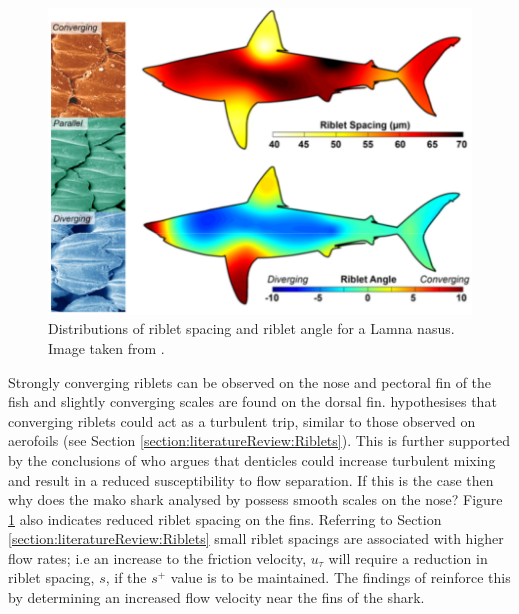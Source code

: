 \documentclass[12pt,oneside,a4paper]{article}
\begin{document}
\begin{figure}[!b]
\centering
\includegraphics[width=0.8\linewidth]{images/litReview/fletcherSharkMorphology.png}
\caption{Distributions of riblet spacing and riblet angle for a Lamna nasus. Image taken from \cite{fletcher2014phd}.}
\label{figure:litReview:fletcherMorphology}
\end{figure}
%
Strongly converging riblets can be observed on the nose and pectoral fin of the fish and slightly converging scales are found on the dorsal fin. \cite{fletcher2014phd} hypothesises that converging riblets could act as a turbulent trip, similar to those observed on aerofoils (see Section \ref{section:literatureReview:Riblets}). This is further supported by the conclusions of \cite{bechert1985} who argues that denticles could increase turbulent mixing and result in a reduced susceptibility to flow separation. If this is the case then why does the mako shark analysed by \cite{diez2015} possess smooth scales on the nose? Figure \ref{figure:litReview:fletcherMorphology} also indicates reduced riblet spacing on the fins. Referring to Section \ref{section:literatureReview:Riblets} small riblet spacings are associated with higher flow rates; i.e an increase to the friction velocity, $u_\tau$ will require a reduction in riblet spacing, $s$, if the $s^+$ value is to be maintained. The findings of \cite{diez2015} reinforce this by determining an increased flow velocity near the fins of the shark. 
\end{document}
